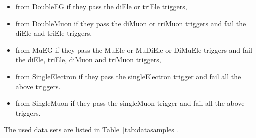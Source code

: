 \begin{itemize}
\item from DoubleEG if they pass the diEle %
  or triEle triggers, %
\item from DoubleMuon if they pass the diMuon %
  or triMuon %
  triggers and fail the diEle and triEle triggers,
\item from MuEG if they pass the MuEle %
  or MuDiEle %
  or DiMuEle %
  triggers and fail the diEle, triEle, diMuon and triMuon triggers,
\item from SingleElectron if they pass the singleElectron trigger %
  and fail all the above triggers.
\item from SingleMuon if they pass the singleMuon trigger %
  and fail all the above triggers.
\end{itemize}

The used data sets are listed in Table~\ref{tab:datasamples}.%

